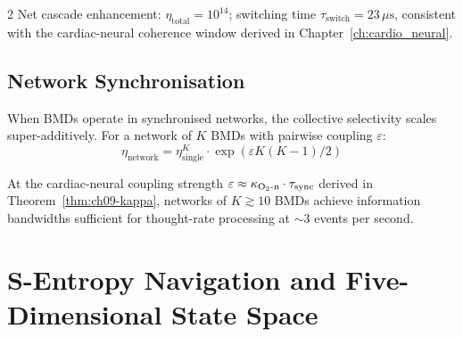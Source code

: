 \begin{multicols}{2}
Net cascade enhancement: $\eta_{\mathrm{total}} = 10^{14}$; switching time $\tau_{\mathrm{switch}} = 23\,\mu\mathrm{s}$, consistent with the cardiac-neural coherence window derived in Chapter~\ref{ch:cardio_neural}.

\subsection{Network Synchronisation}

When BMDs operate in synchronised networks, the collective selectivity scales super-additively. For a network of $K$ BMDs with pairwise coupling $\varepsilon$:
\begin{equation}
\eta_{\mathrm{network}} = \eta_{\mathrm{single}}^K \cdot \exp\!\left(\varepsilon K(K-1)/2\right)
\end{equation}

At the cardiac-neural coupling strength $\varepsilon \approx \kappa_{\mathrm{O_2\text{-}n}} \cdot \tau_{\mathrm{sync}}$ derived in Theorem~\ref{thm:ch09-kappa}, networks of $K \gtrsim 10$ BMDs achieve information bandwidths sufficient for thought-rate processing at $\sim\!3$ events per second.

\end{multicols}

\section{S-Entropy Navigation and Five-Dimensional State Space}

